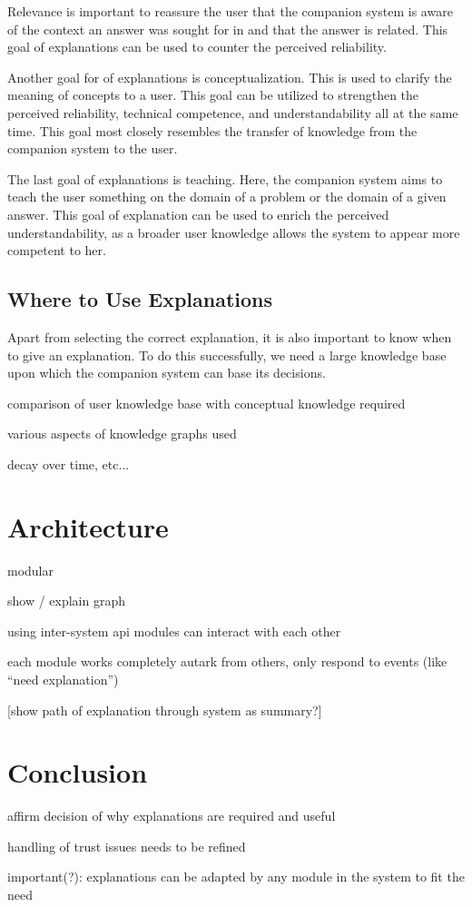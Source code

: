 \documentclass[a4paper]{article}
\begin{document}
Relevance is important to reassure the user that the companion system is aware of the context an answer was sought for in and that the answer is related. This goal of explanations can be used to counter the perceived reliability.

Another goal for of explanations is conceptualization. This is used to clarify the meaning of concepts to a user. This goal can be utilized to strengthen the perceived reliability, technical competence, and understandability all at the same time. This goal most closely resembles the transfer of knowledge from the companion system to the user.

The last goal of explanations is teaching. Here, the companion system aims to teach the user something on the domain of a problem or the domain of a given answer. This goal of explanation can be used to enrich the perceived understandability, as a broader user knowledge allows the system to appear more competent to her.

\subsection{Where to Use Explanations}

Apart from selecting the correct explanation, it is also important to know when to give an explanation. To do this successfully, we need a large knowledge base upon which the companion system can base its decisions.

comparison of user knowledge base with conceptual knowledge required

various aspects of knowledge graphs used

decay over time, etc...

\section{Architecture}

modular

show / explain graph

using inter-system api modules can interact with each other

each module works completely autark from others, only respond to events (like “need explanation”)

[show path of explanation through system as summary?]

\section{Conclusion}

affirm decision of why explanations are required and useful

handling of trust issues needs to be refined

important(?): explanations can be adapted by any module in the system to fit the need

\newpage


\end{document}
